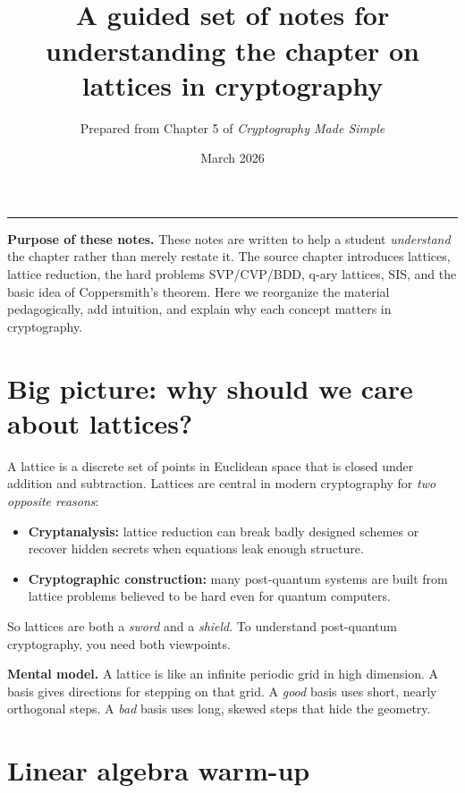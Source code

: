 \documentclass[11pt]{article}
\title{\vspace{-1.5em}{\Huge\bfseries\color{titleblue} Lecture Notes on Lattices, Hard Problems, and Coppersmith's Method}\\[0.4em]
{\large A guided set of notes for understanding the chapter on lattices in cryptography}}
\author{Prepared from Chapter 5 of \emph{Cryptography Made Simple}}
\date{March 2026}
\newenvironment{infobox}{%
  \def\FrameCommand{\fboxrule=0.8pt \fboxsep=8pt \colorbox{noteblue}}%
  \MakeFramed{\advance\hsize-\width \FrameRestore}}{\endMakeFramed}
\newenvironment{greenboxenv}{%
  \def\FrameCommand{\fboxrule=0.8pt \fboxsep=8pt \colorbox{greenbox}}%
  \MakeFramed{\advance\hsize-\width \FrameRestore}}{\endMakeFramed}
\begin{document}
\maketitle

\begin{center}
\rule{0.92\linewidth}{0.5pt}
\end{center}

\begin{infobox}
\textbf{Purpose of these notes.} These notes are written to help a student \emph{understand} the chapter rather than merely restate it. The source chapter introduces lattices, lattice reduction, the hard problems SVP/CVP/BDD, q-ary lattices, SIS, and the basic idea of Coppersmith's theorem. Here we reorganize the material pedagogically, add intuition, and explain why each concept matters in cryptography.
\end{infobox}

\tableofcontents

\section{Big picture: why should we care about lattices?}

A lattice is a discrete set of points in Euclidean space that is closed under addition and subtraction. Lattices are central in modern cryptography for \emph{two opposite reasons}:
\begin{itemize}
    \item \textbf{Cryptanalysis:} lattice reduction can break badly designed schemes or recover hidden secrets when equations leak enough structure.
    \item \textbf{Cryptographic construction:} many post-quantum systems are built from lattice problems believed to be hard even for quantum computers.
\end{itemize}

So lattices are both a \emph{sword} and a \emph{shield}. To understand post-quantum cryptography, you need both viewpoints.

\begin{greenboxenv}
\textbf{Mental model.} A lattice is like an infinite periodic grid in high dimension. A basis gives directions for stepping on that grid. A \emph{good} basis uses short, nearly orthogonal steps. A \emph{bad} basis uses long, skewed steps that hide the geometry.
\end{greenboxenv}

\section{Linear algebra warm-up}
\end{document}
